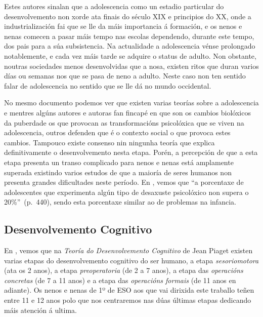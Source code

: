 Estes autores sinalan que a adolescencia como un estadio particular do desenvolvemento non xorde ata finais do século XIX e principios do XX, onde a industrialización fai que se lle da máis importancia á formación, e os nenos e nenas comecen a pasar máis tempo nas escolas dependendo, durante este tempo, dos pais para a súa subsistencia. Na actualidade a adolescencia vénse prolongado notablemente, e cada vez máis tarde se adquire o status de adulto. Non obstante, noutras sociedades menos desenvolvidas que a nosa, existen ritos que duran varios días ou semanas nos que se pasa de neno a adulto. Neste caso non ten sentido falar de adolescencia no sentido que se lle dá no mundo occidental.

No mesmo documento podemos ver que existen varias teorías sobre a adolescencia e mentres algúns autores e autoras fan fincapé en que son os cambios biolóxicos da puberdade os que provocan as transformacións psicolóxica que se viven na adolescencia, outros defenden que é o contexto social o que provoca estes cambios. Tampouco existe consenso nin ningunha teoría que explica definitivamente o desenvolvemento nesta etapa. Porén, a percepción de que a esta etapa presenta un transo complicado para nenos e nenas está amplamente superada existindo varios estudos de que a maioría de seres humanos non presenta grandes dificultades neste período. En , vemos que ``a porcentaxe de adolescentes que experimenta algún tipo de desaxuste psicolóxico non supera o 20\%''~(p.~440), sendo esta porcentaxe similar ao de problemas na infancia.

\subsection{Desenvolvemento Cognitivo}
En , vemos que na \emph{Teoría do Desenvolvemento Cognitivo} de Jean Piaget existen varias etapas do desenvolvemento cognitivo do ser humano, a etapa \emph{sesoriomotora} (ata os 2 anos), a etapa \emph{preoperatoria} (de 2 a 7 anos), a etapa das \emph{operacións concretas} (de 7 a 11 anos) e a etapa das \emph{operacións formais} (de 11 anos en adiante). Os nenos e nenas de 1º de ESO aos que vai dirixida este traballo teñen entre 11 e 12 anos polo que nos centraremos nas dúas últimas etapas dedicando máis atención á ultima.

